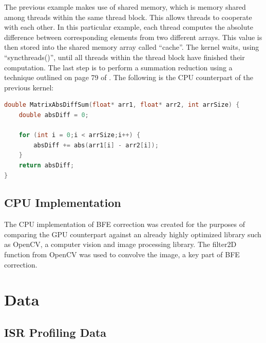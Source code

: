 \documentclass[DM,authoryear,toc]{lsstdoc}
\begin{document}
The previous example makes use of shared memory, which is memory shared among threads within the same thread block. This allows threads to cooperate with each other. In this particular example, each thread computes the absolute difference between corresponding elements from two different arrays. This value is then stored into the shared memory array called ``cache''. The kernel waits, using ``syncthreads()'', until all threads within the thread block have finished their computation. The last step is to perform a summation reduction using a technique outlined on page 79 of \cite{cudaex:2010}. The following is the CPU counterpart of the previous kernel:

\begin{lstlisting}[language=C++,basicstyle=\small,frame=single]
double MatrixAbsDiffSum(float* arr1, float* arr2, int arrSize) {
    double absDiff = 0;
    
    for (int i = 0;i < arrSize;i++) {
        absDiff += abs(arr1[i] - arr2[i]);
    }
    return absDiff;
}
\end{lstlisting}

\subsection{CPU Implementation}
The CPU implementation of BFE correction was created for the purposes of comparing the GPU counterpart against an already highly optimized library such as OpenCV, a computer vision and image processing library. The filter2D function from OpenCV was used to convolve the image, a key part of BFE correction. 

\section{Data}
\subsection{ISR Profiling Data}
\end{document}
